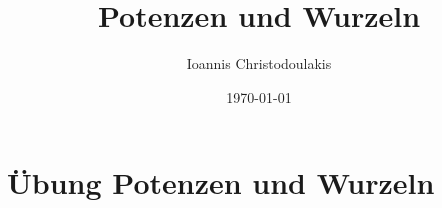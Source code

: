 \documentclass[11pt, a4paper, twoside, fleqn]{article}
\title{Potenzen und Wurzeln}
\author{Ioannis Christodoulakis}
\date{\today}
\begin{document}
\maketitle
\newpage
\newpage
\section{Übung Potenzen und Wurzeln}
\end{document}
